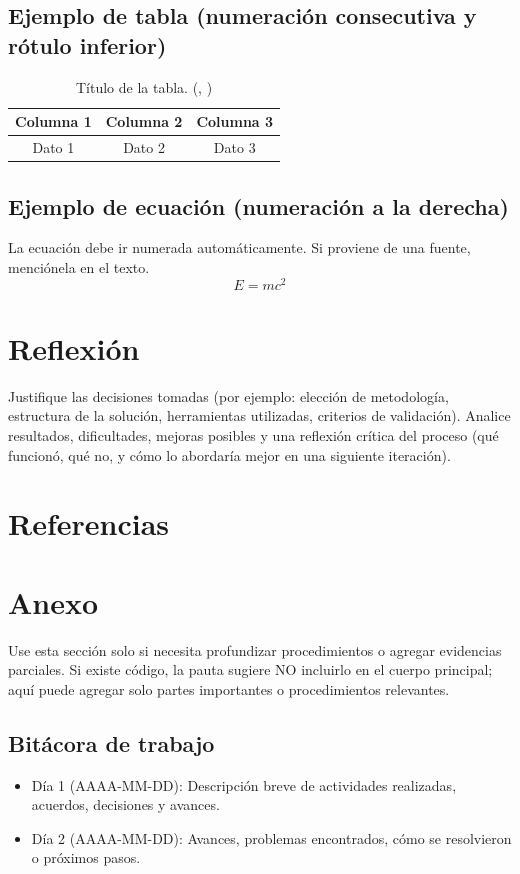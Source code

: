 \documentclass[10pt]{article}
\begin{document}
\subsection{Ejemplo de tabla (numeración consecutiva y rótulo inferior)}
\begin{table}[h]
\centering
\begin{tabular}{ccc}
\toprule
Columna 1 & Columna 2 & Columna 3 \\
\midrule
Dato 1 & Dato 2 & Dato 3 \\
\bottomrule
\end{tabular}
\caption{Título de la tabla. (\citeauthor{autorEjemplo2020}, \citeyear{autorEjemplo2020})}
\label{tab:ejemplo}
\end{table}

\subsection{Ejemplo de ecuación (numeración a la derecha)}
La ecuación debe ir numerada automáticamente. Si proviene de una fuente, menciónela en el texto.
\begin{equation}
E = mc^2
\label{eq:energia}
\end{equation}

\section{Reflexión}
Justifique las decisiones tomadas (por ejemplo: elección de metodología, estructura de la solución, herramientas utilizadas, criterios de validación). Analice resultados, dificultades, mejoras posibles y una reflexión crítica del proceso (qué funcionó, qué no, y cómo lo abordaría mejor en una siguiente iteración).

\section{Referencias}



\appendix
\section{Anexo}
Use esta sección solo si necesita profundizar procedimientos o agregar evidencias parciales. Si existe código, la pauta sugiere NO incluirlo en el cuerpo principal; aquí puede agregar solo partes importantes o procedimientos relevantes.

\subsection{Bitácora de trabajo}
\begin{itemize}
    \item Día 1 (AAAA-MM-DD): Descripción breve de actividades realizadas, acuerdos, decisiones y avances.
    \item Día 2 (AAAA-MM-DD): Avances, problemas encontrados, cómo se resolvieron o próximos pasos.
\end{itemize}
\end{document}
